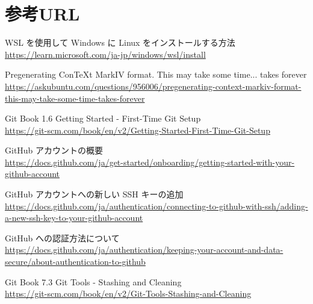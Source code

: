 \documentclass[aspectratio=169,dvipdfmx,cjk]{beamer}
\begin{document}
\section*{参考URL}
\begin{frame}{\insertsection}
  \scriptsize
  \begin{thebibliography}{99}
  \beamertemplatetextbibitems

   WSL を使用して Windows に Linux をインストールする方法\\
  \href{https://learn.microsoft.com/ja-jp/windows/wsl/install}{https://learn.microsoft.com/ja-jp/windows/wsl/install}

   Pregenerating ConTeXt MarkIV format. This may take some time... takes forever\\
  \href{https://askubuntu.com/questions/956006/pregenerating-context-markiv-format-this-may-take-some-time-takes-forever
  }{https://askubuntu.com/questions/956006/pregenerating-context-markiv-format-this-may-take-some-time-takes-forever}

   Git Book 1.6 Getting Started - First-Time Git Setup\\
  \href{https://git-scm.com/book/en/v2/Getting-Started-First-Time-Git-Setup
  }{https://git-scm.com/book/en/v2/Getting-Started-First-Time-Git-Setup}

   GitHub アカウントの概要\\
  \href{https://docs.github.com/ja/get-started/onboarding/getting-started-with-your-github-account
  }{https://docs.github.com/ja/get-started/onboarding/getting-started-with-your-github-account}
  
   GitHub アカウントへの新しい SSH キーの追加\\
  \href{https://docs.github.com/ja/authentication/connecting-to-github-with-ssh/adding-a-new-ssh-key-to-your-github-account
  }{https://docs.github.com/ja/authentication/connecting-to-github-with-ssh/adding-a-new-ssh-key-to-your-github-account}

   GitHub への認証方法について\\
  \href{https://docs.github.com/ja/authentication/keeping-your-account-and-data-secure/about-authentication-to-github
  }{https://docs.github.com/ja/authentication/keeping-your-account-and-data-secure/about-authentication-to-github}

   Git Book 7.3 Git Tools - Stashing and Cleaning\\
  \href{https://git-scm.com/book/en/v2/Git-Tools-Stashing-and-Cleaning
  }{https://git-scm.com/book/en/v2/Git-Tools-Stashing-and-Cleaning}

  \end{thebibliography}
\end{frame}
\end{document}
